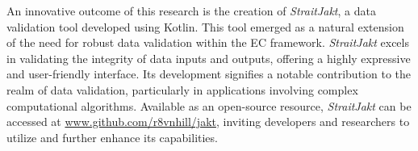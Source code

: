     An innovative outcome of this research is the creation of \textit{StraitJakt}, a data validation tool developed 
    using Kotlin. This tool emerged as a natural extension of the need for robust data validation within the EC 
    framework. \textit{StraitJakt} excels in validating the integrity of data inputs and outputs, offering a highly 
    expressive and user-friendly interface. Its development signifies a notable contribution to the realm of data 
    validation, particularly in applications involving complex computational algorithms. Available as an open-source 
    resource, \textit{StraitJakt} can be accessed at \url{www.github.com/r8vnhill/jakt}, inviting developers and 
    researchers to utilize and further enhance its capabilities.
